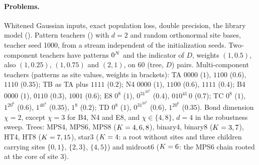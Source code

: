 \paragraph{Problems.}
Whitened Gaussian inputs, exact population loss, double precision, the library model
(). Pattern teachers () with $d=2$ and
random orthonormal site bases, teacher seed 1000, from a stream independent of the initialization
seeds. Two-component teachers have patterns $0^N$ and the indicator of $D$, weights $(1,0.5)$, also
$(1,0.25)$, $(1,0.75)$ and $(2,1)$, on 60 (tree, $D$) pairs. Multi-component teachers (patterns as
site values, weights in brackets): TA $0000$ ($1$), $1100$ ($0.6$), $1110$ ($0.35$); TB as TA plus
$1111$ ($0.2$); N4 $0000$ ($1$), $1100$ ($0.6$), $1111$ ($0.4$); B4 $0000$ ($1$), $0110$ ($0.3$), $1001$
($0.6$); E8 $0^8$ ($1$), $0^31^20^3$ ($0.4$), $010^41\,0$ ($0.7$); TC $0^8$ ($1$), $1^20^6$ ($0.6$),
$1^40^4$ ($0.35$), $1^8$ ($0.2$); TD $0^8$ ($1$), $0^31^20^3$ ($0.6$), $1^20^6$ ($0.35$). Bond dimension
$\chi=2$, except $\chi=3$ for B4, N4 and E8, and $\chi\in\{4,8\}$, $d=4$ in the robustness sweep. Trees:
MPS4, MPS6, MPS8 ($K=4,6,8$), binary4, binary8 ($K=3,7$), HT4, HT8 ($K=7,15$), star3 ($K=4$: a
root without sites and three children carrying sites $\{0,1\}$, $\{2,3\}$, $\{4,5\}$) and midroot6
($K=6$: the MPS6 chain rooted at the core of site 3).

